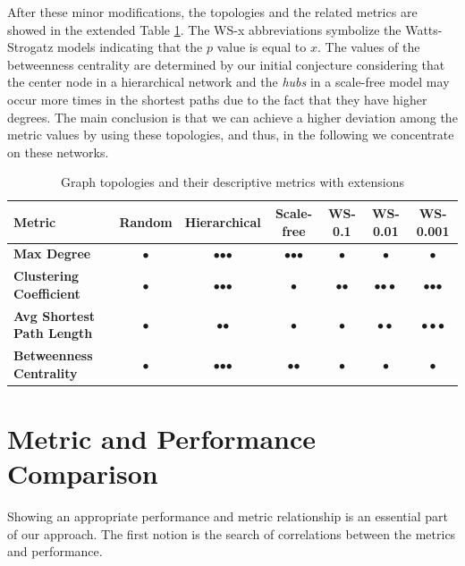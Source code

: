 After these minor modifications, the topologies and the related metrics are showed in the extended Table \ref{tab:topology_metrics2}. The \textsf{WS-x} abbreviations symbolize the Watts-Strogatz models indicating that the $p$ value is equal to $x$. The values of the betweenness centrality are determined by our initial conjecture considering that the center node in a hierarchical network and the \textit{hubs} in a scale-free model may occur more times in the shortest paths due to the fact that they have higher degrees. The main conclusion is that we can achieve a higher deviation among the metric values by using these topologies, and thus, in the following we concentrate on these networks.
\begin{table}[ht]
	\footnotesize
	\centering
	
	\begin{tabular}{ l c c c c c c}
		\toprule
		Metric & Random & Hierarchical & Scale-free & WS-0.1 & WS-0.01 & WS-0.001 \\ 
		\midrule 
		\textbf{Max Degree} & $\bullet$ & $\bullet$$\bullet$$\bullet$ & $\bullet$$\bullet$$\bullet$ & $\bullet$ & $\bullet$ & $\bullet$ \\ \hline
		\textbf{Clustering Coefficient} & $\bullet$ & $\bullet$$\bullet$$\bullet$ & $\bullet$ & $\bullet$$\bullet$ & $\bullet$$\bullet \bullet$ & $\bullet$$\bullet$$\bullet$\\ \hline
		\textbf{Avg Shortest Path Length} & $\bullet$ & $\bullet$$\bullet$ & $\bullet$ & $\bullet $ & $\bullet \bullet$ & $\bullet \bullet \bullet$\\ \hline
		\textbf{Betweenness Centrality} & $\bullet$ & $\bullet$$\bullet$$\bullet$ & $\bullet$$\bullet$ & $\bullet$ & $\bullet$ & $\bullet$\\ \hline
		\bottomrule
	\end{tabular}
	\caption{Graph topologies and their descriptive metrics with extensions}
	\label{tab:topology_metrics2}
\end{table}

\section{Metric and Performance Comparison}

Showing an appropriate performance and metric relationship is an essential part of our approach. The first notion is the search of correlations between the metrics and performance.

